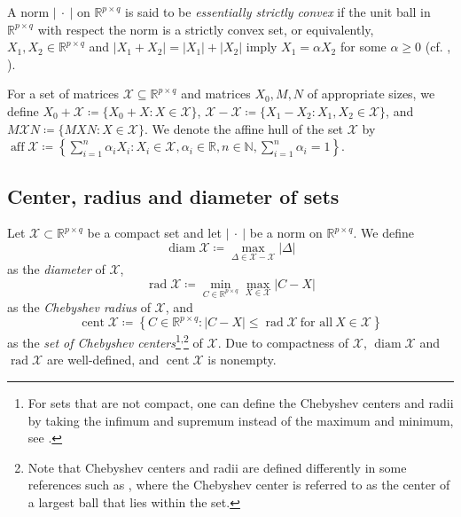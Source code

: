 \documentclass[pdflatex,sn-mathphys-num]{sn-jnl}%
\DeclareMathOperator{\rad}{rad}
\DeclareMathOperator{\cent}{cent}
\DeclareMathOperator{\diam}{diam}
\DeclareMathOperator{\aff}{aff}
\newcommand{\norm}[1]{\left|#1\right|}
\theoremstyle{thmstyleone}
\begin{document}
A norm $\norm{\ \cdot\ }$ on $\mathbb{R}^{p\times q}$ is said to be \emph{essentially strictly convex} if the unit ball in $\mathbb{R}^{p\times q}$ with respect the norm is a strictly convex set, or equivalently, $X_1,X_2\in\mathbb{R}^{p\times q}$ and $\norm{X_1+X_2}=\norm{X_1}+\norm{X_2}$ imply $X_1=\alpha X_2$ for some $\alpha\geq0$ (cf. \cite[p. 106]{holmes2006course}, \cite[eq. 2.8]{ziketak1988characterization}). 

For a set of matrices $\mathcal{X}\subseteq\mathbb{R}^{p\times q}$ and matrices $X_0,M,N$ of appropriate sizes, we define $X_0+\mathcal{X}\coloneqq\{X_0+X:X\in\mathcal{X}\}$, $\mathcal{X}-\mathcal{X}\coloneqq\{X_1-X_2:X_1,X_2\in\mathcal{X}\}$, and $M \mathcal{X}N\coloneqq \{M XN:X\in\mathcal{X}\}$. We denote the affine hull of the set $\mathcal{X}$ \linebreak by $\aff\mathcal{X}\coloneqq\left\{\sum_{i=1}^n\alpha_iX_i:X_i\in\mathcal{X},\alpha_i\in\mathbb{R},n\in\mathbb{N},\sum_{i=1}^n \alpha_i=1\right\}$. 

\subsection{Center, radius and diameter of sets}

Let $\mathcal{X}\subset\mathbb{R}^{p\times q}$ be a compact set and let $\norm{\ \cdot\ }$ be a norm on $\mathbb{R}^{p\times q}$. We define
\begin{equation}
\label{eq:diam}
\diam \mathcal{X}\coloneqq \max_{\Delta\in\mathcal{X}-\mathcal{X}} \norm{\Delta} 
\end{equation} 
as the \emph{diameter} of $\mathcal{X}$, 
\begin{equation}
\label{eq:cheb}
\rad \mathcal{X}\coloneqq \min_{C\in\mathbb{R}^{p\times q}} \max_{X\in\mathcal{X}} \norm{C-X}
\end{equation}
as the \emph{Chebyshev radius} of $\mathcal{X}$, and
\begin{equation}
\label{eq:cent}
\cent\mathcal{X}\coloneqq \left\{C\in\mathbb{R}^{p\times q}:\norm{C-X}\leq\rad\mathcal{X}\ \text{for all}\  X\in\mathcal{X}\right\}
\end{equation}
as the \emph{set of Chebyshev centers}\footnote{For sets that are not compact, one can define the Chebyshev centers and radii by taking the infimum and supremum instead of the maximum and minimum, see \cite{alimov2019chebyshev}.}\textsuperscript{,}\footnote{Note that Chebyshev centers and radii are defined differently in some references such as \mbox{\cite[Chapter 
8.5.2]{boyd2004convex}}, where the Chebyshev center is referred to as the center of a largest ball that lies within the set. } of $\mathcal{X}$. Due to compactness of $\mathcal{X}$, $\diam\mathcal{X}$ and $\rad\mathcal{X}$ are well-defined, and $\cent\mathcal{X}$ is nonempty. 
\end{document}
